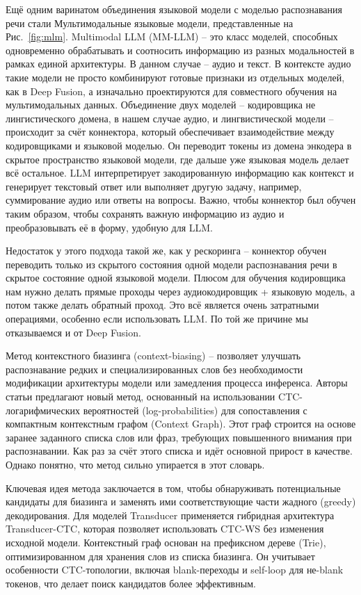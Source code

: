 Ещё одним варинатом объединения языковой модели с моделью распознавания речи стали Мультимодальные языковые модели, представленные на Рис.~\ref{fig:mlm}.
Multimodal LLM (MM-LLM)\cite{grattafiori2024llama, chu2023qwen, tang2023salmonn, radhakrishnan2023whispering} -- это класс моделей, способных одновременно обрабатывать и соотносить информацию из разных модальностей в рамках единой архитектуры.
В данном случае -- аудио и текст.
В контексте аудио такие модели не просто комбинируют готовые признаки из отдельных моделей, как в Deep Fusion, а изначально проектируются для совместного обучения на мультимодальных данных.
Объединение двух моделей -- кодировщика не лингистического домена, в нашем случае аудио, и лингвистической модели -- происходит за счёт коннектора, который обеспечивает взаимодействие между кодировщиками и языковой моделью\cite{li2022blip,radford2021learning,chu2023qwen}.
Он переводит токены из домена энкодера в скрытое пространство языковой модели, где дальше уже языковая модель делает всё остальное.
LLM интерпретирует закодированную информацию как контекст и генерирует текстовый ответ или выполняет другую задачу, например, суммирование аудио или ответы на вопросы.
Важно, чтобы коннектор был обучен таким образом, чтобы сохранять важную информацию из аудио и преобразовывать её в форму, удобную для LLM.

Недостаток у этого подхода такой же, как у рескоринга -- коннектор обучен переводить только из скрытого состояния одной модели распознавания речи в скрытое состояние одной языковой модели.
Плюсом для обучения кодировщика нам нужно делать прямые проходы через аудиокодировщик + языковую модель, а потом также делать обратный проход.
Это всё является очень затратными операциями, особенно если использовать LLM.
По той же причине мы отказываемся и от Deep Fusion.

Метод контекстного биазинга (context-biasing)\cite{andrusenko2024fast} --  позволяет улучшать распознавание редких и специализированных слов без необходимости модификации архитектуры модели или замедления процесса инференса.
Авторы статьи предлагают новый метод, основанный на использовании CTC-логарифмических вероятностей (log-probabilities) для сопоставления с компактным контекстным графом (Context Graph).
Этот граф строится на основе заранее заданного списка слов или фраз, требующих повышенного внимания при распознавании.
Как раз за счёт этого списка и идёт основной прирост в качестве.
Однако понятно, что метод сильно упирается в этот словарь.

Ключевая идея метода заключается в том, чтобы обнаруживать потенциальные кандидаты для биазинга и заменять ими соответствующие части жадного (greedy) декодирования.
Для моделей Transducer применяется гибридная архитектура Transducer-CTC, которая позволяет использовать CTC-WS без изменения исходной модели.
Контекстный граф основан на префиксном дереве (Trie), оптимизированном для хранения слов из списка биазинга.
Он учитывает особенности CTC-топологии, включая blank-переходы и self-loop для не-blank токенов, что делает поиск кандидатов более эффективным.


